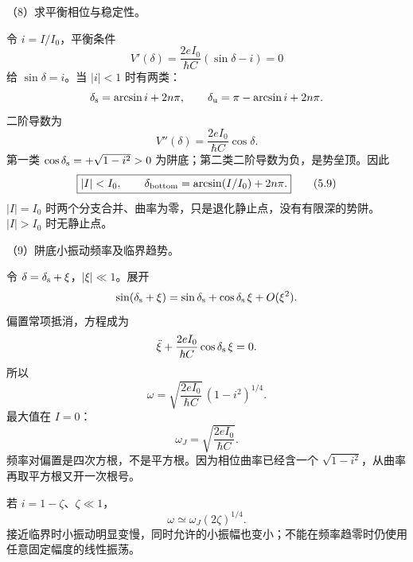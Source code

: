 \documentclass[12pt,a4paper,fontset=fandol]{ctexart}
\begin{document}
\begin{center}
\begin{minipage}{\linewidth}
\centering\begingroup
{}
\ifdim\wd\diagrambox>.88\linewidth
\sbox{\diagrambox}{\resizebox{.88\linewidth}{!}{\usebox{\diagrambox}}}
\fi
\ifdim\ht\diagrambox>.40\textheight
\resizebox{!}{.40\textheight}{\usebox{\diagrambox}}
\else\usebox{\diagrambox}\fi
\par{}
\endgroup\end{minipage}
\end{center}

（8）求平衡相位与稳定性。

令 \(i=I/I_0\)，平衡条件 \[
V'(\delta)=\frac{2eI_0}{\hbar C}(\sin\delta-i)=0
\] 给 \(\sin\delta=i\)。当 \(|i|<1\) 时有两类： \[
\delta_{\rm s}=\arcsin i+2n\pi,
\qquad
\delta_{\rm u}=\pi-\arcsin i+2n\pi.
\] 二阶导数为 \[
V''(\delta)=\frac{2eI_0}{\hbar C}\cos\delta.
\] 第一类 \(\cos\delta_{\rm s}=+\sqrt{1-i^2}>0\)
为阱底；第二类二阶导数为负，是势垒顶。因此 \[
\boxed{|I|<I_0,\qquad
\delta_{\rm bottom}=\arcsin(I/I_0)+2n\pi.}\tag{5.9}
\] \(|I|=I_0\)
时两个分支合并、曲率为零，只是退化静止点，没有有限深的势阱。\(|I|>I_0\)
时无静止点。

（9）阱底小振动频率及临界趋势。

令 \(\delta=\delta_{\rm s}+\xi\)，\(|\xi|\ll1\)。展开 \[
\sin(\delta_{\rm s}+\xi)
=\sin\delta_{\rm s}+\cos\delta_{\rm s}\,\xi+O(\xi^2).
\] 偏置常项抵消，方程成为 \[
\ddot\xi+\frac{2eI_0}{\hbar C}\cos\delta_{\rm s}\,\xi=0.
\] 所以 \[
\boxed{\omega=
\sqrt{\frac{2eI_0}{\hbar C}}\,(1-i^2)^{1/4}.}\tag{5.10}
\] 最大值在 \(I=0\)： \[
\boxed{\omega_J=\sqrt{\frac{2eI_0}{\hbar C}}.}\tag{5.11}
\] 频率对偏置是四次方根，不是平方根。因为相位曲率已经含一个
\(\sqrt{1-i^2}\)，从曲率再取平方根又开一次根号。

若 \(i=1-\zeta\)、\(\zeta\ll1\)， \[
\omega\simeq\omega_J(2\zeta)^{1/4}.
\]
接近临界时小振动明显变慢，同时允许的小振幅也变小；不能在频率趋零时仍使用任意固定幅度的线性振荡。
\end{document}
